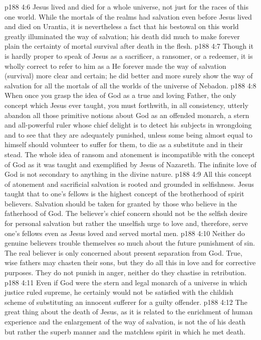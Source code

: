 \vs p188 4:6 Jesus lived and died for a whole universe, not just for the races of this one world. While the mortals of the realms had salvation even before Jesus lived and died on Urantia, it is nevertheless a fact that his bestowal on this world greatly illuminated the way of salvation; his death did much to make forever plain the certainty of mortal survival after death in the flesh.
\vs p188 4:7 Though it is hardly proper to speak of Jesus as a sacrificer, a ransomer, or a redeemer, it is wholly correct to refer to him as a  He forever made the way of salvation (survival) more clear and certain; he did better and more surely show the way of salvation for all the mortals of all the worlds of the universe of Nebadon.
\vs p188 4:8 When once you grasp the idea of God as a true and loving Father, the only concept which Jesus ever taught, you must forthwith, in all consistency, utterly abandon all those primitive notions about God as an offended monarch, a stern and all\hyp{}powerful ruler whose chief delight is to detect his subjects in wrongdoing and to see that they are adequately punished, unless some being almost equal to himself should volunteer to suffer for them, to die as a substitute and in their stead. The whole idea of ransom and atonement is incompatible with the concept of God as it was taught and exemplified by Jesus of Nazareth. The infinite love of God is not secondary to anything in the divine nature.
\vs p188 4:9 All this concept of atonement and sacrificial salvation is rooted and grounded in selfishness. Jesus taught that  to one’s fellows is the highest concept of the brotherhood of spirit believers. Salvation should be taken for granted by those who believe in the fatherhood of God. The believer’s chief concern should not be the selfish desire for personal salvation but rather the unselfish urge to love and, therefore, serve one’s fellows even as Jesus loved and served mortal men.
\vs p188 4:10 Neither do genuine believers trouble themselves so much about the future punishment of sin. The real believer is only concerned about present separation from God. True, wise fathers may chasten their sons, but they do all this in love and for corrective purposes. They do not punish in anger, neither do they chastise in retribution.
\vs p188 4:11 Even if God were the stern and legal monarch of a universe in which justice ruled supreme, he certainly would not be satisfied with the childish scheme of substituting an innocent sufferer for a guilty offender.
\vs p188 4:12 The great thing about the death of Jesus, as it is related to the enrichment of human experience and the enlargement of the way of salvation, is not the  of his death but rather the superb manner and the matchless spirit in which he met death.
